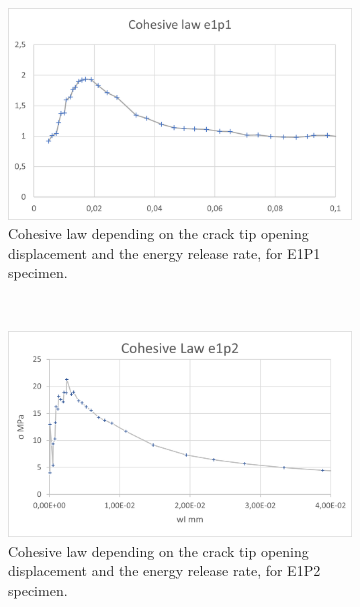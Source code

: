 \begin{figure}[H]
	\centering
	\begin{subfigure}{0.48\linewidth}
		\centering
		\includegraphics[scale=0.6]{Figures/e1p1_colaw}
		\decoRule
		\caption[Cohesive law from E1P1 specimen]{Cohesive law depending on the crack tip opening displacement and the energy release rate, for E1P1 specimen.}
		\label{fig:E1P1_colaw}
	\end{subfigure}
	\hfill\\
	\begin{subfigure}{0.48\linewidth}
		\centering
		\includegraphics[scale=0.6]{Figures/e1p2_colaw}
		\decoRule
		\caption[Cohesive law from E1P2 specimen]{Cohesive law depending on the crack tip opening displacement and the energy release rate, for E1P2 specimen.}
		\label{fig:E1P2_colaw}
	\end{subfigure}
	\hfill\\
	\begin{subfigure}{0.48\linewidth}
		\centering

\end{subfigure}
\end{figure}

